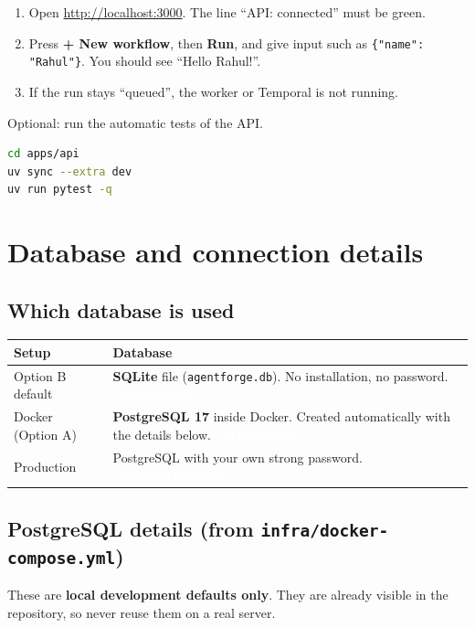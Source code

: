 \documentclass[11pt,a4paper]{article}
\newcommand{\sWork}{\colorbox{okc}{\textcolor{white}{\scriptsize\bfseries\ WORKING\ }}}
\newcommand{\sDeploy}{\colorbox{deployc}{\textcolor{white}{\scriptsize\bfseries\ DEPLOYMENT\ }}}
\begin{document}
\begin{enumerate}[nosep]
  \item Open \url{http://localhost:3000}. The line ``API: connected'' must be green.
  \item Press \textbf{+ New workflow}, then \textbf{Run}, and give input such as \texttt{\{"name": "Rahul"\}}. You should see ``Hello Rahul!''.
  \item If the run stays ``queued'', the worker or Temporal is not running.
\end{enumerate}

Optional: run the automatic tests of the API.
\begin{lstlisting}[language=bash]
cd apps/api
uv sync --extra dev
uv run pytest -q
\end{lstlisting}

\section{Database and connection details}

\subsection{Which database is used}

\begin{longtable}{@{}L{3.6cm}L{12cm}@{}}
\toprule
\textbf{Setup} & \textbf{Database} \\
\midrule
\endhead
Option B default & \textbf{SQLite} file (\texttt{agentforge.db}). No installation, no password. \sWork \\
Docker (Option A) & \textbf{PostgreSQL 17} inside Docker. Created automatically with the details below. \sWork \\
Production & PostgreSQL with your own strong password. \sDeploy \\
\bottomrule
\end{longtable}

\subsection{PostgreSQL details (from \texttt{infra/docker-compose.yml})}

These are \textbf{local development defaults only}. They are already visible in the
repository, so never reuse them on a real server.
\end{document}
